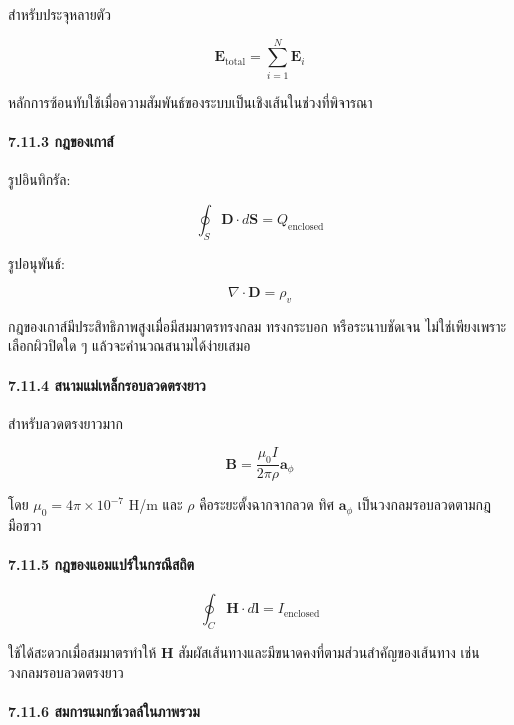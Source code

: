 สำหรับประจุหลายตัว

\[
\mathbf{E}_{\text{total}}=\sum_{i=1}^{N}\mathbf{E}_i
\]

หลักการซ้อนทับใช้เมื่อความสัมพันธ์ของระบบเป็นเชิงเส้นในช่วงที่พิจารณา

\paragraph{7.11.3 กฎของเกาส์}

รูปอินทิกรัล:

\[
\oint_S\mathbf{D}\cdot d\mathbf{S}=Q_{\text{enclosed}}
\]

รูปอนุพันธ์:

\[
\nabla\cdot\mathbf{D}=\rho_v
\]

กฎของเกาส์มีประสิทธิภาพสูงเมื่อมีสมมาตรทรงกลม ทรงกระบอก หรือระนาบชัดเจน ไม่ใช่เพียงเพราะเลือกผิวปิดใด ๆ แล้วจะคำนวณสนามได้ง่ายเสมอ

\paragraph{7.11.4 สนามแม่เหล็กรอบลวดตรงยาว}

สำหรับลวดตรงยาวมาก

\[
\mathbf{B}=\frac{\mu_0I}{2\pi\rho}\mathbf{a}_\phi
\]

โดย \(\mu_0=4\pi\times10^{-7}\) H/m และ \(\rho\) คือระยะตั้งฉากจากลวด ทิศ \(\mathbf{a}_\phi\) เป็นวงกลมรอบลวดตามกฎมือขวา

\paragraph{7.11.5 กฎของแอมแปร์ในกรณีสถิต}

\[
\oint_C\mathbf{H}\cdot d\mathbf{l}=I_{\text{enclosed}}
\]

ใช้ได้สะดวกเมื่อสมมาตรทำให้ \(\mathbf{H}\) สัมผัสเส้นทางและมีขนาดคงที่ตามส่วนสำคัญของเส้นทาง เช่น วงกลมรอบลวดตรงยาว

\paragraph{7.11.6 สมการแมกซ์เวลล์ในภาพรวม}

